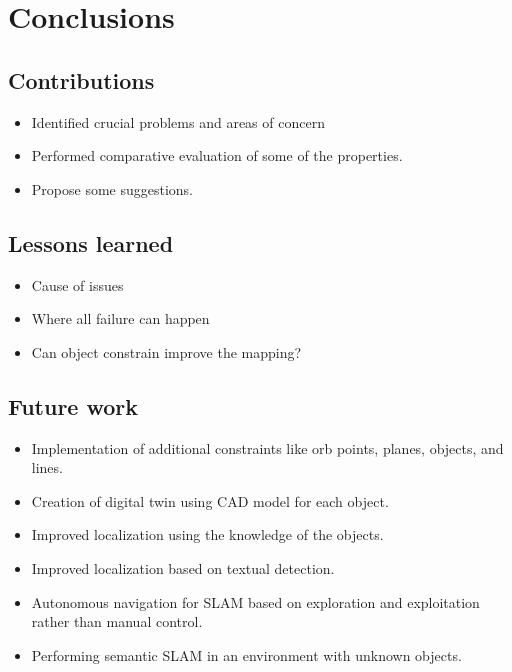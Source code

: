 \documentclass[report.tex]{subfiles}
\begin{document}
    \chapter{Conclusions}

    \section{Contributions}
    
    \begin{itemize}
        \item Identified crucial problems and areas of concern
        \item Performed comparative evaluation of some of the properties.
        \item Propose some suggestions.

    \end{itemize}

    \section{Lessons learned}
    
    \begin{itemize}
        \item Cause of issues
        \item Where all failure can happen
        \item Can object constrain improve the mapping?
    \end{itemize}

    \section{Future work}
    \begin{itemize}
        \item Implementation of additional constraints like orb points, planes, objects, and lines.
        \item Creation of digital twin using CAD model for each object.
        \item Improved localization using the knowledge of the objects.
        \item Improved localization based on textual detection.
        \item Autonomous navigation for SLAM based on exploration and exploitation rather than manual control.
        \item Performing semantic SLAM in an environment with unknown objects.
    \end{itemize}
\end{document}
